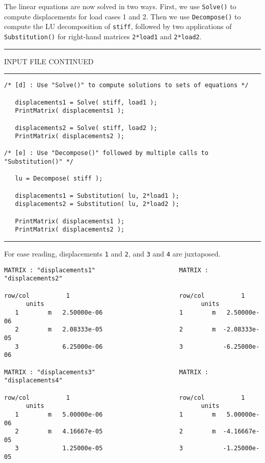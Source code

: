 \vspace{0.15 in}
\noindent\hspace{0.5 in}
The linear equations are now solved in two ways.
First, we use {\tt Solve()} to compute displacements for load cases 1 and 2.
Then we use {\tt Decompose()} to compute the LU decomposition of {\tt stiff},
followed by two applications of {\tt Substitution()} for
right-hand matrices {\tt 2*load1} and {\tt 2*load2}.

\vspace{0.15 in}
\begin{footnotesize}
\noindent
{\rule{2.2 in}{0.035 in} INPUT FILE CONTINUED \rule{2.2 in}{0.035 in} }
\begin{verbatim}
/* [d] : Use "Solve()" to compute solutions to sets of equations */

   displacements1 = Solve( stiff, load1 );
   PrintMatrix( displacements1 );

   displacements2 = Solve( stiff, load2 );
   PrintMatrix( displacements2 );

/* [e] : Use "Decompose()" followed by multiple calls to "Substitution()" */

   lu = Decompose( stiff );

   displacements1 = Substitution( lu, 2*load1 );
   displacements2 = Substitution( lu, 2*load2 );

   PrintMatrix( displacements1 );
   PrintMatrix( displacements2 );
\end{verbatim}
\rule{6.25 in}{0.035 in}
\end{footnotesize}

\vspace{0.15 in}\noindent
For ease reading, displacements {\tt 1} and {\tt 2},
and {\tt 3} and {\tt 4} are juxtaposed.

\vspace{0.15 in}
\begin{footnotesize}
\begin{verbatim}
MATRIX : "displacements1"                       MATRIX : "displacements2"

row/col          1                              row/col          1          
      units                                           units             
   1        m   2.50000e-06                     1        m   2.50000e-06
   2        m   2.08333e-05                     2        m  -2.08333e-05
   3            6.25000e-06                     3           -6.25000e-06

MATRIX : "displacements3"                       MATRIX : "displacements4"

row/col          1                              row/col          1          
      units                                           units             
   1        m   5.00000e-06                     1        m   5.00000e-06
   2        m   4.16667e-05                     2        m  -4.16667e-05
   3            1.25000e-05                     3           -1.25000e-05
\end{verbatim}
\end{footnotesize}


